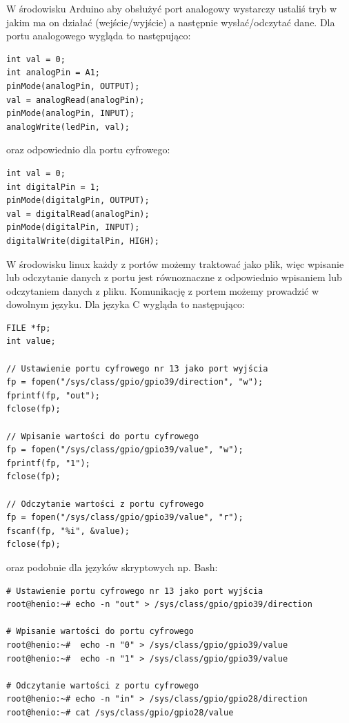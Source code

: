 \documentclass{xmgr}
\begin{document}
W środowisku Arduino aby obsłużyć port analogowy wystarczy ustaliś tryb w jakim ma on działać (wejście/wyjście) a następnie wysłać/odczytać dane. Dla portu analogowego wygląda to następująco:
\begin{lstlisting}[label=bot-dirs-alg,caption=Obsługa portu analogowego w środowisku Arduino]
int val = 0;
int analogPin = A1;	
pinMode(analogPin, OUTPUT);
val = analogRead(analogPin);
pinMode(analogPin, INPUT);
analogWrite(ledPin, val);
\end{lstlisting}

oraz odpowiednio dla portu cyfrowego:
\begin{lstlisting}[label=bot-dirs-alg,caption=Obsługa portu cyfrowego w środowisku Arduino]
int val = 0;
int digitalPin = 1;	
pinMode(digitalgPin, OUTPUT);
val = digitalRead(analogPin);
pinMode(digitalPin, INPUT);
digitalWrite(digitalPin, HIGH);
\end{lstlisting}

W środowisku linux każdy z portów możemy traktować jako plik, więc wpisanie lub odczytanie danych z portu jest równoznaczne z odpowiednio wpisaniem lub odczytaniem danych z pliku. Komunikację z portem możemy prowadzić w dowolnym języku. Dla języka C wygląda to następująco:

\begin{lstlisting}[label=bot-dirs-alg,caption=Obsługa portu cyfrowego w środowisku Linux (język C)]
FILE *fp;
int value;

// Ustawienie portu cyfrowego nr 13 jako port wyjścia
fp = fopen("/sys/class/gpio/gpio39/direction", "w");
fprintf(fp, "out");
fclose(fp);

// Wpisanie wartości do portu cyfrowego
fp = fopen("/sys/class/gpio/gpio39/value", "w");
fprintf(fp, "1");
fclose(fp);

// Odczytanie wartości z portu cyfrowego
fp = fopen("/sys/class/gpio/gpio39/value", "r");
fscanf(fp, "%i", &value);
fclose(fp);
\end{lstlisting}

oraz podobnie dla języków skryptowych np. Bash:

\begin{lstlisting}[label=bot-dirs-alg,caption=Obsługa portu cyfrowego w środowisku Linux (bash)]
# Ustawienie portu cyfrowego nr 13 jako port wyjścia
root@henio:~# echo -n "out" > /sys/class/gpio/gpio39/direction

# Wpisanie wartości do portu cyfrowego
root@henio:~#  echo -n "0" > /sys/class/gpio/gpio39/value
root@henio:~#  echo -n "1" > /sys/class/gpio/gpio39/value

# Odczytanie wartości z portu cyfrowego
root@henio:~# echo -n "in" > /sys/class/gpio/gpio28/direction
root@henio:~# cat /sys/class/gpio/gpio28/value
\end{lstlisting}
\end{document}
